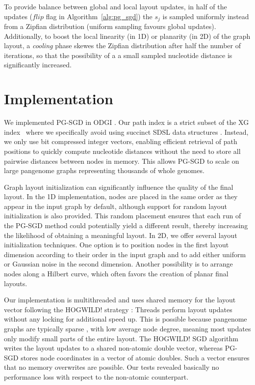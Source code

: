 \documentclass{bioinfo}
\theoremstyle{definition}
\begin{document}
	To provide balance between global and local layout updates, in half of the updates ($flip$ flag in Algorithm~\ref{alg:pg_sgd}) the $s_j$ is sampled uniformly instead from a Zipfian distribution (uniform sampling favours global updates).
	Additionally, to boost the local linearity (in 1D) or planarity (in 2D) of the graph layout, a \textit{cooling} phase skewes the Zipfian distribution after half the number of iterations, so that the possibility of a a small sampled nucleotide distance is significantly increased. 

	\section{Implementation}
	
	We implemented PG-SGD in ODGI \citep{Guarracino2022}. %
	Our path index is a strict subset of the XG index~\citep{Garrison:2018} where we specifically avoid using succinct SDSL data structures \citep{Gog2014}.
	Instead, we only use bit compressed integer vectors, enabling efficient retrieval of path positions to quickly compute nucleotide distances without the need to store all pairwise distances between nodes in memory.
	This allows PG-SGD to scale on large pangenome graphs representing thousands of whole genomes.

	Graph layout initialization can significantly influence the quality of the final layout.
	In the 1D implementation, nodes are placed in the same order as they appear in the input graph by default, although support for random layout initialization is also provided.
	This random placement ensures that each run of the PG-SGD method could potentially yield a different result, thereby increasing the likelihood of obtaining a meaningful layout.
	In 2D, we offer several layout initialization techniques.
	One option is to position nodes in the first layout dimension according to their order in the input graph and to add either uniform or Gaussian noise in the second dimension.
	Another possibility is to arrange nodes along a Hilbert curve, which often favors the creation of planar final layouts.

	Our implementation is multithreaded and uses shared memory for the layout vector following the HOGWILD! strategy \citep{Recht2011}: Threads perform layout updates without any locking for additional speed up.
	This is possible because pangenome graphs are typically sparse \citep{Guarracino2022}, with low average node degree, meaning most updates only modify small parts of the entire layout.
	The HOGWILD! SGD algorithm writes the layout updates to a shared non-atomic double vector, whereas PG-SGD stores node coordinates in a vector of atomic doubles.
	Such a vector ensures that no memory overwrites are possible. Our tests revealed basically no performance loss with respect to the non-atomic counterpart.
	
\end{document}
